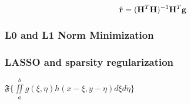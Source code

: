 \begin{equation}
	\hat{ \mathbf{r} } = ( \mathbf{H}^T \mathbf{H} )^{-1} \mathbf{H}^T \mathbf{g}
\end{equation}

\subsubsection{L0 and L1 Norm Minimization}

\subsubsection{LASSO and sparsity regularization}

$  \mathfrak{F} \{ \iint\limits_{a}^{b}  g( \xi, \eta )  h( x - \xi, y - \eta )  d \xi d \eta \}  $

%  
%



